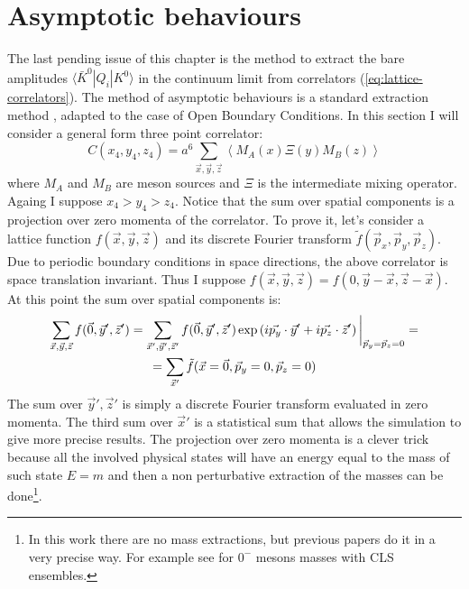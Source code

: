 \documentclass[english, LaM, oneside, noexaminfo]{sapthesis}
\newcommand{\la}{\langle}
\newcommand{\ra}{\rangle}
\newcommand{\obc}{Open Boundary Conditions}
\begin{document}
\section{Asymptotic behaviours}\label{sec:asympt-behav}
\noindent
The last pending issue of this chapter is the method to extract the bare amplitudes $\la \bar K^0 | Q_i | K^0 \ra$ in the continuum limit from correlators (\ref{eq:lattice-correlators}).
The method of asymptotic behaviours is a standard extraction method \cite{montvay-munster}, adapted to the case of \obc\space \cite{ExtractionSpectralQuantities}.
In this section I will consider a general form three point correlator:
\begin{equation}\label{eq:correlator-prototype}
    C(x_4,y_4,z_4) = a^6\sum_{\vec x, \vec y, \vec z} \left\la M_A (x) \Xi (y) M_B (z) \right\ra
\end{equation}
where $M_{A}$ and $M_{B}$ are meson sources and $\Xi$ is the intermediate mixing operator.
Againg I suppose $x_4 > y_4 > z_4$.
Notice that the sum over spatial components is a projection over zero momenta of the correlator.
To prove it, let's consider a lattice function $f(\vec x,\vec y,\vec z)$ and its discrete Fourier transform $\tilde{f}(\vec p_x,\vec p_y,\vec p_z)$.
Due to periodic boundary conditions in space directions, the above correlator is space translation invariant.
Thus I suppose $f(\vec x, \vec y, \vec z) = f(0, \vec y - \vec x, \vec z - \vec x)$.
At this point the sum over spatial components is:
\begin{equation*}
    \begin{gathered}
        \sum_{\vec x, \vec y, \vec z} f(\vec 0,\vec y',\vec z') = \sum_{\vec x', \vec y', \vec z'} f(\vec 0,\vec y',\vec z') \hspace*{.5mm} \text{exp}\left(i\vec{p_y}\cdot\vec{y}'+i\vec{p_z}\cdot\vec{z}' \right)\bigg|_{\vec p_y = \vec p_z = 0} = \\
        = \sum_{\vec x'} \tilde{f}(\vec x = \vec 0, \vec p_y = 0, \vec p_z = 0)
    \end{gathered}
\end{equation*}
The sum over $\vec y', \vec z'$ is simply a discrete Fourier transform evaluated in zero momenta. The third sum over $\vec x'$ is a statistical sum that allows the simulation to give more precise results.
The projection over zero momenta is a clever trick because all the involved physical states will have an energy equal to the mass of such state $E=m$ and then a non perturbative extraction of the masses can be done\footnote{In this work there are no mass extractions, but previous papers do it in a very precise way. For example see \cite{LightMesons}\cite{OBC-tm} for $0^{-}$ mesons masses with CLS ensembles.}.
\end{document}
